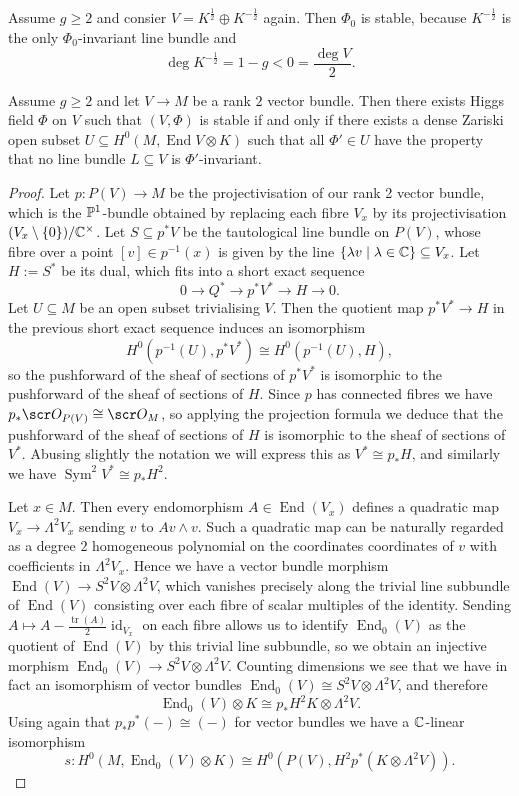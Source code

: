 \documentclass[A4paper, 12pt, british, reqno]{amsart}
\DeclareMathOperator{\End}{End}
\DeclareMathOperator{\Sym}{Sym}
\DeclareMathOperator{\id}{id}
\newcommand{\ot}{\otimes}
\newcommand{\op}{\oplus}
\newcommand{\dual}{^{*}}
\begin{document}
\begin{exa}
    Assume $g\geqslant 2$ and consier $V=K^{\frac{1}{2}}\op K^{-\frac{1}{2}}$ again.
    Then $\Phi_{0}$ is stable, because $K^{-\frac{1}{2}}$ is the only $\Phi_{0}$-invariant line bundle and
    \[ \deg{K^{-\frac{1}{2}}}=1-g<0=\frac{\deg{V}}{2}. \]
\end{exa}

\begin{prop}
    Assume $g\geqslant 2$ and let $V\to M$ be a rank $2$ vector bundle.
Then there exists Higgs field $\Phi$ on $V$ such that $(V,\Phi)$ is stable if and only if there exists a dense Zariski open subset $U\subseteq H^{0}(M,\End{V}\ot K)$ such that all $\Phi'\in U$ have the property that no line bundle $L\subseteq V$ is $\Phi'$-invariant.
    \begin{proof}
	Let $p\colon P(V)\to M$ be the projectivisation of our rank 2 vector bundle, which is the $\P^{1}$-bundle obtained by replacing each fibre $V_{x}$ by its projectivisation $(V_{x}\setminus \{0\})/\C^{\times}$.
	Let $S\subseteq p^{*}V$ be the tautological line bundle on $P(V)$, whose fibre over a point $[v]\in p^{-1}(x)$ is given by the line $\{ \lambda v \mid \lambda \in \C \}\subseteq V_{x}$.
	Let $H:=S\dual$ be its dual, which fits into a short exact sequence
	\[ 0\to Q\dual \to p^{*}V\dual \to H \to 0. \]
	Let $U\subseteq M$ be an open subset trivialising $V$.
	Then the quotient map $p^{*}V\dual \to H$ in the previous short exact sequence induces an isomorphism
	\[ H^{0}(p^{-1}(U),p^{*}V\dual)\cong H^{0}(p^{-1}(U),H), \]
	so the pushforward of the sheaf of sections of $p^{*}V\dual$ is isomorphic to the pushforward of the sheaf of sections of $H$.
	Since $p$ has connected fibres we have $p_{*}\O_{P(V)}\cong \O_{M}$, so applying the projection formula \cite[Exercise II.5.1.d]{har77} we deduce that the pushforward of the sheaf of sections of $H$ is isomorphic to the sheaf of sections of $V\dual$.
	Abusing slightly the notation we will express this as $V\dual \cong p_{*}H$, and similarly we have $\Sym^{2}V\dual\cong p_{*}H^{2}$.

	Let $x\in M$.
	Then every endomorphism $A\in \End(V_{x})$ defines a quadratic map $V_{x}\to \Lambda^{2}V_{x}$ sending $v$ to $Av\wedge v$.
	Such a quadratic map can be naturally regarded as a degree $2$ homogeneous polynomial on the coordinates coordinates of $v$ with coefficients in $\Lambda^{2}V_{x}$.
	Hence we have a vector bundle morphism $\End(V)\to S^{2}V\ot \Lambda^{2}V$, which vanishes precisely along the trivial line subbundle of $\End(V)$ consisting over each fibre of scalar multiples of the identity.
	Sending $A\mapsto A-\frac{\operatorname{tr}(A)}{2}\id_{V_{x}}$ on each fibre allows us to identify $\End_{0}(V)$ as the quotient of $\End(V)$ by this trivial line subbundle, so we obtain an injective morphism $\End_{0}(V)\to S^{2}V\ot \Lambda^{2}V$.
	Counting dimensions we see that we have in fact an isomorphism of vector bundles $\End_{0}(V)\cong S^{2}V\ot \Lambda^{2}V$, and therefore
	\[ \End_{0}(V)\ot K\cong p_{*}H^{2}K\ot \Lambda^{2}V. \]
	Using again that $p_{*}p^{*}(-)\cong (-)$ for vector bundles we have a $\C$-linear isomorphism
	\[ s\colon H^{0}(M,\End_{0}(V)\ot K)\cong H^{0}(P(V),H^{2}p^{*}(K\ot \Lambda^{2}V)). \]


\end{proof}
\end{prop}
\end{document}
